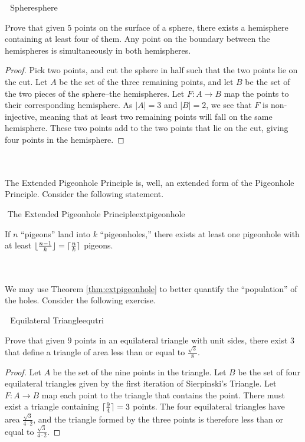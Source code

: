         \begin{exercise}{\Difficulty\,\Difficulty\,\Difficulty\,\,Sphere}{sphere}
        
            Prove that given \(5\) points on the surface of a sphere, there exists a hemisphere containing at least four of them. Any point on the boundary between the hemispheres is simultaneously in both hemispheres.
            \begin{proof}
                Pick two points, and cut the sphere in half such that the two points lie on the cut. Let \(A\) be the set of the three remaining points, and let \(B\) be the set of the two pieces of the sphere--the hemispheres. Let \(F:A\to B\) map the points to their corresponding hemisphere. As \(|A|=3\) and \(|B|=2\), we see that \(F\) is non-injective, meaning that at least two remaining points will fall on the same hemisphere. These two points add to the two points that lie on the cut, giving four points in the hemisphere.
            \end{proof}
        
        \end{exercise}
        \pagebreak
        \vphantom
        \\
        \\
        The Extended Pigeonhole Principle is, well, an extended form of the Pigeonhole Principle. Consider the following statement.
        \begin{theorem}{\Stop\,\,The Extended Pigeonhole Principle}{extpigeonhole}
        
            If \(n\) ``pigeons'' land into \(k\) ``pigeonholes,'' there exists at least one pigeonhole with at least \(\lfloor\frac{n-1}{k}\rfloor=\lceil\frac{n}{k}\rceil\) pigeons.
        
        \end{theorem}
        \vphantom
        \\
        \\
        We may use Theorem \ref{thm:extpigeonhole} to better quantify the ``population'' of the holes. Consider the following exercise.
        \begin{exercise}{\Difficulty\,\Difficulty\,\Difficulty\,\,Equilateral Triangle}{equtri}
        
            Prove that given \(9\) points in an equilateral triangle with unit sides, there exist \(3\) that define a triangle of area less than or equal to \(\frac{\sqrt{3}}{8}\).
            \begin{proof}
                Let \(A\) be the set of the nine points in the triangle. Let \(B\) be the set of four equilateral triangles given by the first iteration of Sierpinski's Triangle. Let \(F:A\to B\) map each point to the triangle that contains the point. There must exist a triangle containing \(\lceil\frac{9}{4}\rceil=3\) points. The four equilateral triangles have area \(\frac{\sqrt{3}}{4\cdot2}\), and the triangle formed by the three points is therefore less than or equal to \(\frac{\sqrt{3}}{4\cdot2}\).
            \end{proof}
        
        \end{exercise}

